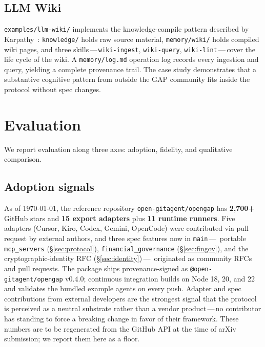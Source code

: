 \documentclass[11pt,a4paper]{article}
\begin{document}
\subsection{LLM Wiki}

\texttt{examples/llm-wiki/} implements the knowledge-compile pattern described by
Karpathy~\cite{karpathy_llmwiki}: \texttt{knowledge/} holds raw source material,
\texttt{memory/wiki/} holds compiled wiki pages, and three
skills\,---\,\texttt{wiki-ingest}, \texttt{wiki-query}, \texttt{wiki-lint}\,---\,cover
the life cycle of the wiki. A \texttt{memory/log.md} operation log records every
ingestion and query, yielding a complete provenance trail. The case study
demonstrates that a substantive cognitive pattern from outside the GAP community
fits inside the protocol without spec changes.

\section{Evaluation}\label{sec:eval}

We report evaluation along three axes: adoption, fidelity, and qualitative comparison.

\subsection{Adoption signals}

As of \today, the reference repository \texttt{open-gitagent/opengap} has
\textbf{2{,}700+} GitHub stars and \textbf{15 export adapters} plus \textbf{11 runtime
runners}. Five adapters (Cursor, Kiro, Codex, Gemini, OpenCode) were contributed via
pull request by external authors, and three spec features now in \texttt{main}\,---\,
portable \texttt{mcp\_servers} (\S\ref{sec:protocol}), \texttt{financial\_governance}
(\S\ref{sec:fingov}), and the cryptographic-identity RFC (\S\ref{sec:identity})\,---\,
originated as community RFCs and pull requests. The package ships provenance-signed as
\texttt{@open-gitagent/opengap} v0.4.0; continuous integration builds on Node 18, 20,
and 22 and validates the bundled example agents on every push. Adapter and spec
contributions from external developers are the strongest signal that the protocol is
perceived as a neutral substrate rather than a vendor product\,---\,no contributor has
standing to force a breaking change in favor of their framework. These numbers are to be
regenerated from the GitHub API at the time of arXiv submission; we report them here as
a floor.
\end{document}
